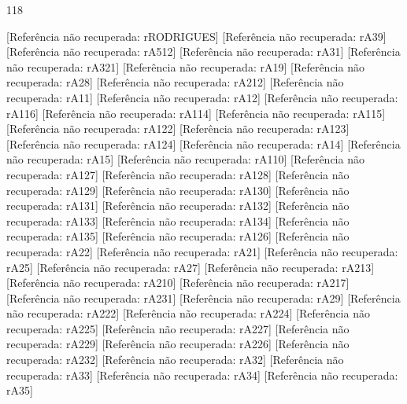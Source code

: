 \begin{thebibliography}{118}
\setlength{\parskip}{3pt}

 [Referência não recuperada: rRODRIGUES]
 [Referência não recuperada: rA39]
 [Referência não recuperada: rA512]
 [Referência não recuperada: rA31]
 [Referência não recuperada: rA321]
 [Referência não recuperada: rA19]
 [Referência não recuperada: rA28]
 [Referência não recuperada: rA212]
 [Referência não recuperada: rA11]
 [Referência não recuperada: rA12]
 [Referência não recuperada: rA116]
 [Referência não recuperada: rA114]
 [Referência não recuperada: rA115]
 [Referência não recuperada: rA122]
 [Referência não recuperada: rA123]
 [Referência não recuperada: rA124]
 [Referência não recuperada: rA14]
 [Referência não recuperada: rA15]
 [Referência não recuperada: rA110]
 [Referência não recuperada: rA127]
 [Referência não recuperada: rA128]
 [Referência não recuperada: rA129]
 [Referência não recuperada: rA130]
 [Referência não recuperada: rA131]
 [Referência não recuperada: rA132]
 [Referência não recuperada: rA133]
 [Referência não recuperada: rA134]
 [Referência não recuperada: rA135]
 [Referência não recuperada: rA126]
 [Referência não recuperada: rA22]
 [Referência não recuperada: rA21]
 [Referência não recuperada: rA25]
 [Referência não recuperada: rA27]
 [Referência não recuperada: rA213]
 [Referência não recuperada: rA210]
 [Referência não recuperada: rA217]
 [Referência não recuperada: rA231]
 [Referência não recuperada: rA29]
 [Referência não recuperada: rA222]
 [Referência não recuperada: rA224]
 [Referência não recuperada: rA225]
 [Referência não recuperada: rA227]
 [Referência não recuperada: rA229]
 [Referência não recuperada: rA226]
 [Referência não recuperada: rA232]
 [Referência não recuperada: rA32]
 [Referência não recuperada: rA33]
 [Referência não recuperada: rA34]
 [Referência não recuperada: rA35]

\end{thebibliography}
